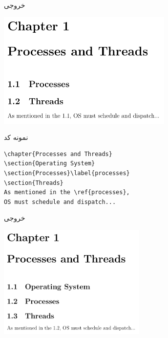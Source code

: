 \begin{frame}{خروجی}
\begin{center}
\includegraphics[width=0.65\textwidth, height=0.7\textheight]{docs/images/proc-ref}
\end{center}
\end{frame}


\begin{frame}[fragile]{نمونه کد}
\begin{latin}
\begin{lstlisting}[keywords={chapter, section, label, ref}, keywordstyle=\color{Mulberry}\textbf]
\chapter{Processes and Threads}
\section{Operating System}
\section{Processes}\label{processes}
\section{Threads}
As mentioned in the \ref{processes}, 
OS must schedule and dispatch...
\end{lstlisting}
\end{latin}
\end{frame}

\begin{frame}{خروجی}
\begin{center}
\includegraphics[width=0.55\textwidth, height=0.7\textheight]{docs/images/proc-ref-1}
\end{center}
\end{frame}


